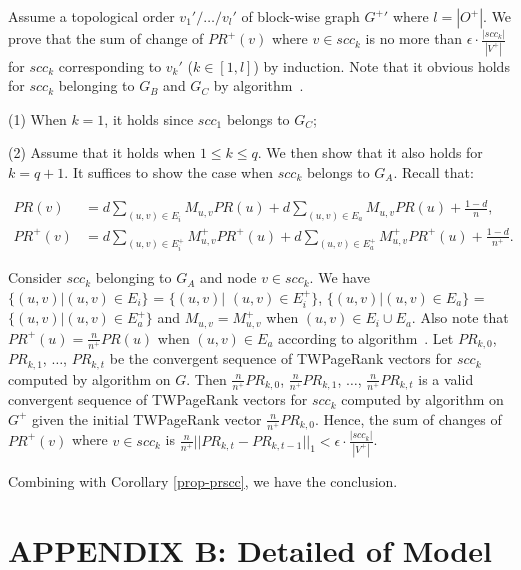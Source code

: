 \vspace{.5ex}
\begin{proofS}
Assume a topological order $v_1'/\dots/v_{l}'$ of block-wise graph $G^+{'}$ where $l=|O^+|$. We prove that the sum of change of $PR^+(v)$ where $v\in scc_k$ is no more than $\epsilon\cdot\frac{|scc_k|}{|V^+|}$ for $scc_k$ corresponding to $v_k'$ ($k\in [1,l]$) by induction. Note that it obvious holds for $scc_k$ belonging to $G_B$ and $G_C$ by algorithm~\inctwprscc.

\noindent(1) When $k=1$, it holds since $scc_1$ belongs to $G_C$;

\noindent(2) Assume that it holds when $1\le k\le q$. We then show that it also holds for $k=q+1$. It suffices to show the case when $scc_k$ belongs to $G_A$. Recall that:

\vspace{-1ex}
\begin{scriptsize}
\begin{equation*}
\begin{split}
PR(v) & =  d \sum_{(u,v)\in E_i} M_{u,v} PR(u) + d \sum_{(u,v)\in E_a} M_{u,v} PR(u) +  \frac{1-d}{n},\\
PR^+(v) & =  d \sum_{(u,v)\in E^+_i} M^+_{u,v} PR^+(u) + d \sum_{(u,v)\in E^+_a} M^+_{u,v} PR^+(u) +  \frac{1-d}{n^+}.
\end{split}
\end{equation*}
\end{scriptsize}
\noindent
Consider $scc_k$ belonging to $G_A$ and node $v\in scc_k$. We have $\{(u,v)|(u,v)\in E_i\}$ = $\{(u,v)|$ $(u,v)\in E^+_i\}$, $\{(u,v)|(u,v)\in E_a\}$ = $\{(u,v)|(u,v)\in E^+_a\}$ and $M_{u,v}=M^+_{u,v}$ when $(u,v)\in E_i\cup E_a$. Also note that $PR^+(u)=\frac{n}{n^+}PR(u)$ when $(u,v)\in E_a$ according to algorithm~\inctwprscc. Let $PR_{k,0}$, $PR_{k,1}$, $\dots$, $PR_{k,t}$ be the convergent sequence of TWPageRank vectors for $scc_k$ computed by algorithm \twprscc on $G$. Then $\frac{n}{n^+}PR_{k,0}$, $\frac{n}{n^+}PR_{k,1}$, $\dots$, $\frac{n}{n^+}PR_{k,t}$ is a valid convergent sequence of TWPageRank vectors for $scc_k$ computed by algorithm \inctwprscc on $G^+$ given the initial TWPageRank vector $\frac{n}{n^+}PR_{k,0}$.
Hence, the sum of changes of $PR^+(v)$ where $v\in scc_k$ is $\frac{n}{n^+}||PR_{k,t}-PR_{k,t-1}||_1 < \epsilon\cdot\frac{|scc_k|}{|V^+|}$.

Combining with Corollary \ref{prop-prscc}, we have the conclusion.
\end{proofS}


\section*{APPENDIX B: Detailed of Model}
\label{sec-exp-app}

